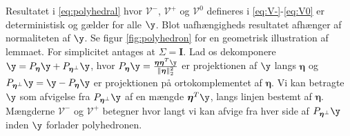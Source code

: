 Resultatet i \eqref{eq:polyhedral} hvor \(\mathcal{V}^-\), \(\mathcal{V}^+\) og \(\mathcal{V}^0\) defineres i \eqref{eq:V-}-\eqref{eq:V0} er deterministisk og gælder for alle \(\y\).
Blot uafhængigheds resultatet afhænger af normaliteten af \(\y\).
Se figur \ref{fig:polyhedron} for en geometrisk illustration af lemmaet.
For simplicitet antages at \(\Sigma= \mathbf{I}\).
Lad os dekomponere \(\y=P_{\boldsymbol{\eta}} \y + P_{\boldsymbol{\eta}^\perp} \y\), hvor \(P_{\boldsymbol{\eta}} \y = \frac{\boldsymbol{\eta} \boldsymbol{\eta}^T \y}{\Vert \boldsymbol{\eta} \Vert_2^2}\) er projektionen af \(\y\) langs \(\boldsymbol{\eta}\) og  \(P_{\boldsymbol{\eta}^\perp} \y = \y - P_{\boldsymbol{\eta}} \y\) er projektionen på ortokomplementet af \(\boldsymbol{\eta}\).
Vi kan betragte \(\y\) som afvigelse fra \(P_{\boldsymbol{\eta}^\perp} \y\) af en mængde \(\boldsymbol{\eta}^T \y\), langs linjen bestemt af \(\boldsymbol{\eta}\).
Mængderne \(\mathcal{V}^-\) og \(\mathcal{V}^+\) betegner hvor langt vi kan afvige fra hver side af \(P_{\boldsymbol{\eta}^\perp} \y\) inden \(\y\) forlader polyhedronen.
